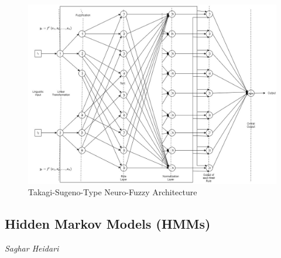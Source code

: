 \begin{figure}[H]
    \centering
    \includegraphics[width=14cm]{gfx/Takagi.png}
    \captionsetup{justification=centering}
    \caption{Takagi-Sugeno-Type Neuro-Fuzzy Architecture}
    \label{fig:Takagi-Sugeno-Type Neuro-Fuzzy Architecture}
\end{figure}


\subsection{Hidden Markov Models (HMMs)}
\vspace*{-15mm}
\hfill{\normalsize\emph{Saghar Heidari}}

